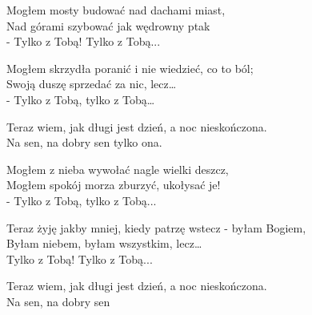 \begin{text}
    Mogłem mosty budować nad dachami miast,\\
    Nad górami szybować jak wędrowny ptak\\
    - Tylko z Tobą! Tylko z Tobą...

    Mogłem skrzydła poranić i nie wiedzieć, co to ból;\\
    Swoją duszę sprzedać za nic, lecz…\\
    - Tylko z Tobą, tylko z Tobą…

    Teraz wiem, jak długi jest dzień, a noc nieskończona.\\
    Na sen, na dobry sen tylko ona.

    Mogłem z nieba wywołać nagle wielki deszcz,\\
    Mogłem spokój morza zburzyć, ukołysać je!\\
    - Tylko z Tobą, tylko z Tobą...

    Teraz żyję jakby mniej, kiedy patrzę wstecz - byłam Bogiem,\\
    Byłam niebem, byłam wszystkim, lecz…\\
    Tylko z Tobą! Tylko z Tobą...

    Teraz wiem, jak długi jest dzień, a noc nieskończona.\\
    Na sen, na dobry sen
\end{text}
